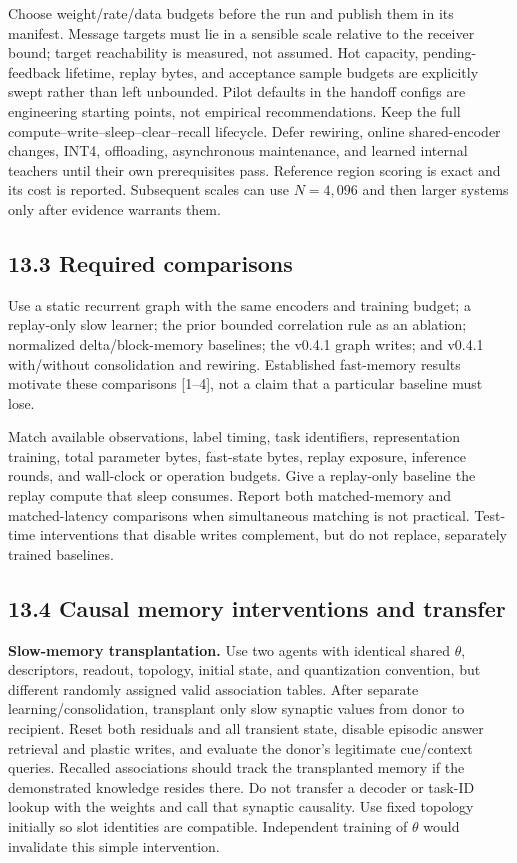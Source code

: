 \documentclass[
  11pt,
  a4paper,
]{article}
\begin{document}
Choose weight/rate/data budgets before the run and publish them in its
manifest. Message targets must lie in a sensible scale relative to the
receiver bound; target reachability is measured, not assumed. Hot
capacity, pending-feedback lifetime, replay bytes, and acceptance sample
budgets are explicitly swept rather than left unbounded. Pilot defaults
in the handoff configs are engineering starting points, not empirical
recommendations. Keep the full compute--write--sleep--clear--recall
lifecycle. Defer rewiring, online shared-encoder changes, INT4,
offloading, asynchronous maintenance, and learned internal teachers
until their own prerequisites pass. Reference region scoring is exact
and its cost is reported. Subsequent scales can use \(N=4,096\) and then
larger systems only after evidence warrants them.

\subsection{13.3 Required comparisons}\label{required-comparisons}

Use a static recurrent graph with the same encoders and training budget;
a replay-only slow learner; the prior bounded correlation rule as an
ablation; normalized delta/block-memory baselines; the v0.4.1 graph
writes; and v0.4.1 with/without consolidation and rewiring. Established
fast-memory results motivate these comparisons {[}1--4{]}, not a claim
that a particular baseline must lose.

Match available observations, label timing, task identifiers,
representation training, total parameter bytes, fast-state bytes, replay
exposure, inference rounds, and wall-clock or operation budgets. Give a
replay-only baseline the replay compute that sleep consumes. Report both
matched-memory and matched-latency comparisons when simultaneous
matching is not practical. Test-time interventions that disable writes
complement, but do not replace, separately trained baselines.

\subsection{13.4 Causal memory interventions and
transfer}\label{causal-memory-interventions-and-transfer}

\textbf{Slow-memory transplantation.} Use two agents with identical
shared \(\theta\), descriptors, readout, topology, initial state, and
quantization convention, but different randomly assigned valid
association tables. After separate learning/consolidation, transplant
only slow synaptic values from donor to recipient. Reset both residuals
and all transient state, disable episodic answer retrieval and plastic
writes, and evaluate the donor's legitimate cue/context queries.
Recalled associations should track the transplanted memory if the
demonstrated knowledge resides there. Do not transfer a decoder or
task-ID lookup with the weights and call that synaptic causality. Use
fixed topology initially so slot identities are compatible. Independent
training of \(\theta\) would invalidate this simple intervention.
\end{document}
